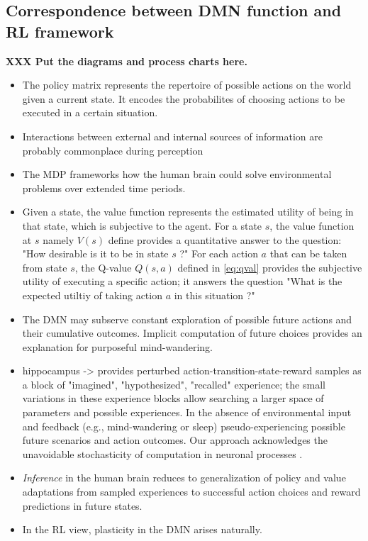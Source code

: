 \documentclass{article} %
\begin{document}
\subsection{Correspondence between DMN function and RL framework}
\textbf{XXX Put the diagrams and process charts here.}
\begin{itemize}
  \item The policy matrix represents the repertoire of possible actions
  on the world given a current state. It encodes the probabilites of
  choosing actions to be executed in a certain situation.
  \item Interactions between external and internal sources of
  information are probably commonplace during perception
  \item The MDP frameworks how the human brain could solve
  environmental problems over extended time periods.
  \item Given a state, the value function represents the estimated utility of
  being in that state, which is subjective to the agent.
  For a state $s$, the value function at $s$ namely $V(s)$ define provides a quantitative answer to the question:
  "How desirable is it to be in state $s$ ?"
  For each action $a$ that can be taken from state $s$,
  the Q-value  $Q(s, a)$ defined in \eqref{eq:qval} provides the subjective
  utility of executing a specific action; it answers the question
  "What is the expected utiltiy of taking action $a$ in this situation ?"
  \item The DMN may subserve
  constant exploration of possible future actions and their
  cumulative outcomes. Implicit computation of future choices
  provides an explanation for purposeful mind-wandering.
  \item hippocampus -> provides perturbed action-transition-state-reward samples
  as a block of "imagined", "hypothesized", "recalled" experience;
  the small variations in these experience blocks allow searching
  a larger space of parameters and possible experiences.
  In the absence of environmental input and feedback
  (e.g., mind-wandering or sleep) pseudo-experiencing possible
  future scenarios and action outcomes.
  Our approach acknowledges the unavoidable stochasticity of
  computation in neuronal processes \citep{faisal2008noise}.
  \item
  \textit{Inference} in the human brain reduces to generalization of
  policy and value adaptations from sampled experiences to
  successful action choices and reward predictions in future states.
  \item In the RL view, plasticity in the DMN arises naturally.

\end{itemize}
\end{document}
